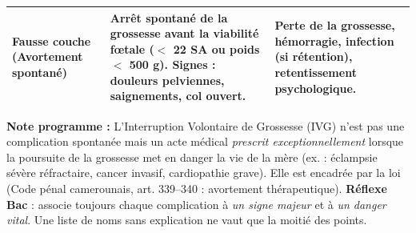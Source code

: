 \documentclass[11pt]{article}
\begin{document}
\begin{methode}
\begin{center}
\begin{tabularx}{\linewidth}{|l|X|X|}
\hline
\textbf{Fausse couche (Avortement spontané)} & Arrêt spontané de la grossesse avant la viabilité f\oe tale ($<$ 22 SA ou poids $<$ 500 g). Signes : douleurs pelviennes, saignements, col ouvert. & Perte de la grossesse, hémorragie, infection (si rétention), retentissement psychologique. \\
\hline
\end{tabularx}
\end{center}
\textbf{Note programme :} L'Interruption Volontaire de Grossesse (IVG) n'est pas une complication spontanée mais un acte médical \emph{prescrit exceptionnellement} lorsque la poursuite de la grossesse met en danger la vie de la mère (ex. : éclampsie sévère réfractaire, cancer invasif, cardiopathie grave). Elle est encadrée par la loi (Code pénal camerounais, art. 339--340 : avortement thérapeutique).
\textbf{Réflexe Bac} : associe toujours chaque complication à \emph{un signe majeur} et à \emph{un danger vital}. Une liste de noms sans explication ne vaut que la moitié des points.
\end{methode}
\end{document}
